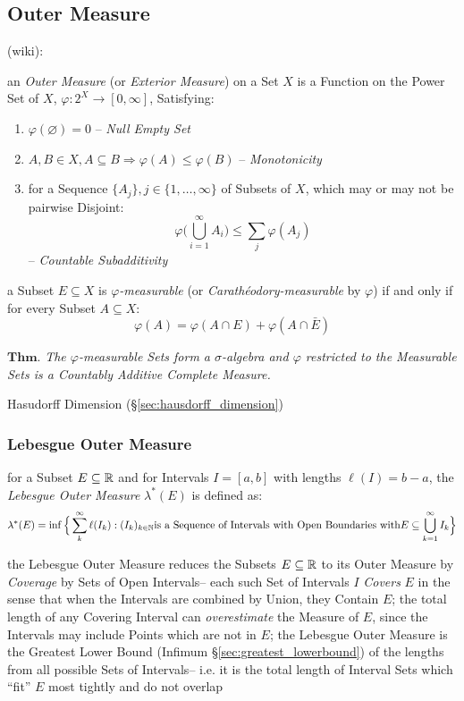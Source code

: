 \subsection{Outer Measure}\label{sec:outer_measure}

(wiki):

an \emph{Outer Measure} (or \emph{Exterior Measure}) on a Set $X$ is a Function
on the Power Set of $X$, $\varphi : 2^X \rightarrow [0, \infty]$, Satisfying:
\begin{enumerate}
  \item $\varphi(\varnothing) = 0$ -- \emph{Null Empty Set}
  \item $A,B \in X, A \subseteq B \Rightarrow \varphi(A) \leq \varphi(B)$ --
    \emph{Monotonicity}
  \item for a Sequence $\{A_j\}, j \in \{1, \ldots, \infty\}$ of Subsets of $X$,
    which may or may not be pairwise Disjoint:
    \[
      \varphi\Big(\bigcup_{i=1}^\infty A_i\Big) \leq \sum_j\varphi(A_j)
    \]
    -- \emph{Countable Subadditivity}
\end{enumerate}

a Subset $E \subseteq X$ is \emph{$\varphi$-measurable} (or
\emph{Carath\'eodory-measurable} by $\varphi$) if and only if for every Subset
$A \subseteq X$:
\[
  \varphi(A) = \varphi(A \cap E) + \varphi(A \cap \bar{E})
\]

$\textbf{Thm.}$ \emph{
  The $\varphi$-measurable Sets form a $\sigma$-algebra and $\varphi$ restricted
  to the Measurable Sets is a Countably Additive Complete Measure.
}

Hasudorff Dimension (\S\ref{sec:hausdorff_dimension})



\subsubsection{Lebesgue Outer Measure}\label{sec:lebesgue_outer_measure}

for a Subset $E \subseteq \mathbb{R}$ and for Intervals $I = [a,b]$ with lengths
$\ell(I) = b-a$, the \emph{Lebesgue Outer Measure} $\lambda^*(E)$ is defined as:
\[
  \lambda^*(E) = \inf \Big\{ \sum_k^\infty \ell(I_k) : (I_k)_{k \in \mathbb{N}}
    \text{is a Sequence of Intervals with Open Boundaries with}
    E \subseteq \bigcup_{k=1}^\infty I_k \Big\}
\]

the Lebesgue Outer Measure reduces the Subsets $E \subseteq \mathbb{R}$ to its Outer
Measure by \emph{Coverage} by Sets of Open Intervals-- each such Set of
Intervals $I$ \emph{Covers} $E$ in the sense that when the Intervals are
combined by Union, they Contain $E$; the total length of any Covering Interval
can \emph{overestimate} the Measure of $E$, since the Intervals may include
Points which are not in $E$; the Lebesgue Outer Measure is the Greatest Lower
Bound (Infimum \S\ref{sec:greatest_lowerbound}) of the lengths from all possible
Sets of Intervals-- i.e. it is the total length of Interval Sets which ``fit''
$E$ most tightly and do not overlap

